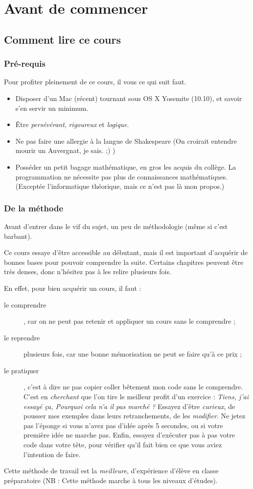 \chapter{Avant de commencer}

\section{Comment lire ce cours}
\subsection{Pré-requis}
Pour profiter pleinement de ce cours, il vous ce qui suit faut.
\begin{itemize}
\item Disposer d'un Mac (récent) tournant sous OS X Yosemite (10.10),
et savoir s'en servir un minimum.
\item Être \emph{persévérant}, \emph{rigoureux} et \emph{logique}.
\item Ne pas faire une allergie à la langue de Shakespeare
(On croirait entendre mourir un Auvergnat, je sais. ;) )
\item Posséder un petit bagage mathématique, en gros les acquis du collège.
La programmation ne nécessite pas plus de connaissances mathématiques.
(Exceptée l'informatique théorique, mais ce n'est pas là mon propos.) 
\end{itemize}

\subsection{De la méthode}
Avant d'entrer dans le vif du sujet,
un peu de méthodologie (même si c'est barbant).


Ce cours essaye d'être accessible au débutant,
mais il est important d'acquérir de bonnes bases
pour pouvoir comprendre la suite.
Certains chapitres peuvent être très denses,
donc n'hésitez pas à les relire plusieurs fois.


En effet, pour bien acquérir un cours, il faut :
\begin{description}
\item[le comprendre],
car on ne peut pas retenir et appliquer un cours sans le comprendre ;
\item[le reprendre] plusieurs fois,
car une bonne mémorisation ne peut se faire qu'à ce prix ;
\item[le pratiquer],
c'est à dire ne pas copier coller bêtement mon code sans le comprendre.
C'est en \emph{cherchant} que l'on tire le meilleur profit d'un exercice :
\og \emph{Tiens, j'ai essayé ça, Pourquoi cela n'a il pas marché ?} \fg{}
Essayez d'être \emph{curieux}, de pousser mes exemples dans leurs retranchements,
de les \emph{modifier}. Ne jetez pas l'éponge si vous n'avez pas d'idée après 5 secondes,
ou si votre première idée ne marche pas.
Enfin, essayez d'exécuter pas à pas votre code dans votre tête,
pour vérifier qu'il fait bien ce que vous aviez l'intention de faire.
\end{description}
Cette méthode de travail est la \emph{meilleure}, d'expérience d'élève en classe préparatoire
(NB : Cette méthode marche à tous les niveaux d'études).
